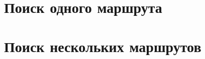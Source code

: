 \FloatBarrier

\section{Поиск одного маршрута}

\FloatBarrier

\section{Поиск нескольких маршрутов}

\FloatBarrier

